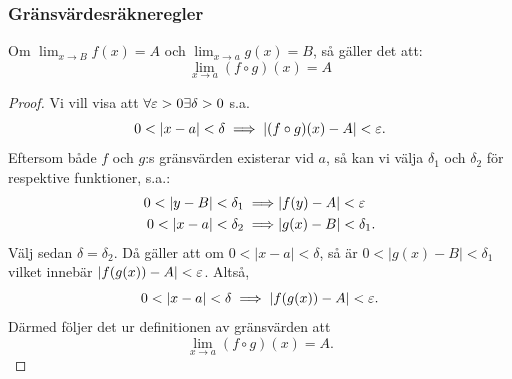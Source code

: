 \begin{theorem}
	
\end{theorem}

\subsubsection{Gränsvärdesräkneregler}

\begin{theorem}\label{sats:sam-g-v.}
	Om $\lim_{x\to B}f(x)=A$ och $\lim_{x\to a}g(x)=B$, så gäller det att:
	$$
		\lim_{x\to a}(f\circ g)(x)=A
	$$
	
	\begin{proof}
		Vi vill visa att $\forall\varepsilon>0\exists\delta>0$ s.a.
		$$
			0<\qty|x-a|<\delta\implies\qty|(f\circ g)(x)-A|<\varepsilon.
		$$
		Eftersom både $f$ och $g$:s gränsvärden existerar vid $a$, så kan vi välja
		$\delta_1$ och $\delta_2$ för respektive funktioner, s.a.:
		\begin{align*}
			0<\qty|y-B|<\delta_1\implies&\qty|f(y)-A|<\varepsilon\\
			0<\qty|x-a|<\delta_2\implies&\qty|g(x)-B|<\delta_1.
		\end{align*}
    	Välj sedan $\delta=\delta_2$. Då gäller att om $0<|x-a|<\delta$, så är
		$0<|g(x)-B|<\delta_1$ vilket innebär $|f(g(x)) - A|<\varepsilon$. Altså,
		$$
			0<|x-a|<\delta\implies|f(g(x)) - A|<\eps.
		$$
    	Därmed följer det ur definitionen av gränsvärden att
		$$
			\lim_{x \to a}(f \circ g)(x)=A.
		$$
	\end{proof}
\end{theorem}


